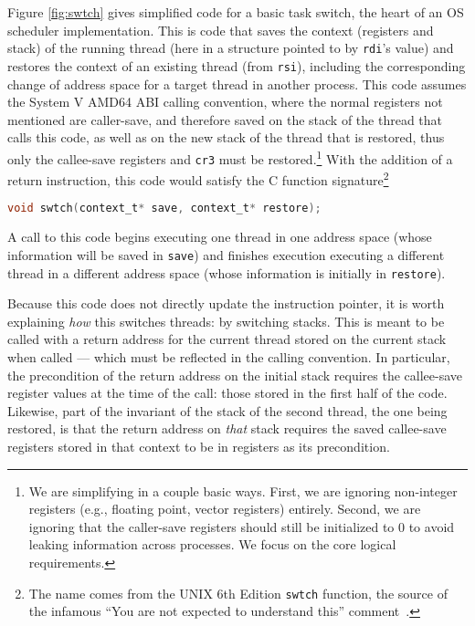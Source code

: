Figure \ref{fig:swtch} gives simplified code for a basic task switch, the heart of an OS scheduler implementation. This is code that saves the context (registers and stack) of the running thread (here in a structure pointed to by \lstinline|rdi|'s value) and restores the context of an existing thread (from \lstinline|rsi|), including the corresponding change of address space for a target thread in another process.
This code assumes the System V AMD64 ABI calling convention, where the normal registers not mentioned are caller-save, and therefore saved on the stack of the thread that calls this code, as well as on the new stack of the thread that is restored, thus only the callee-save registers and \texttt{cr3} must be restored.\footnote{We are simplifying in a couple basic ways. First, we are ignoring non-integer registers (e.g., floating point, vector registers) entirely. Second, we are ignoring that the caller-save registers should still be initialized to 0 to avoid leaking information across processes. We focus on the core logical requirements.}
With the addition of a return instruction, this code would satisfy the C function signature\footnote{The name comes from the UNIX 6th Edition \lstinline|swtch| function, the source of the infamous ``You are not expected to understand this'' comment~\cite{lions1996lions}.}
\begin{lstlisting}[language=C]
void swtch(context_t* save, context_t* restore);
\end{lstlisting}
A call to this code begins executing one thread in one address space (whose information will be saved in \lstinline[language=C]|save|) and finishes execution executing a different thread in a different address space (whose information is initially in \lstinline[language=C]|restore|).

Because this code does not directly update the instruction pointer, it is worth explaining \emph{how} this switches threads: by switching stacks. This is meant to be called with a return address for the current thread stored on the current stack when called --- which must be reflected in the calling convention. In particular, the precondition of the return address on the initial stack requires the callee-save register values at the time of the call: those stored in the first half of the code.
Likewise, part of the invariant of the stack of the second thread, the one being restored, is that the return address on \emph{that} stack requires the saved callee-save registers stored in that context to be in registers as its precondition.

